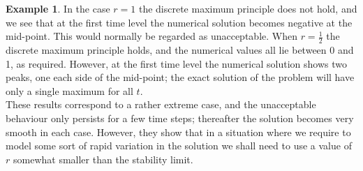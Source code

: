 \documentclass[a4paper,twoside]{ctexart}
\theoremstyle{definition}
\newtheorem{example}[definition]{Example}
\begin{document}
\begin{example}
	\noindent In the case $r = 1$ the discrete maximum principle does not hold, and we see that at the first time level the numerical solution becomes negative
	at the mid-point. This would normally be regarded as unacceptable. When $r = \frac{1}{2}$ the discrete maximum principle holds, and the numerical values all
	lie between 0 and 1, as required. However, at the first time level the numerical solution shows two peaks, one each side of the mid-point; the
	exact solution of the problem will have only a single maximum for all $t$.\\
	These results correspond to a rather extreme case, and the unacceptable behaviour only persists for a few time steps; thereafter the solution
	becomes very smooth in each case. However, they show that in a situation where we require to model some sort of rapid variation in the solution we shall need to use a value of $r$ somewhat smaller than the stability limit.
\end{example}
\end{document}
